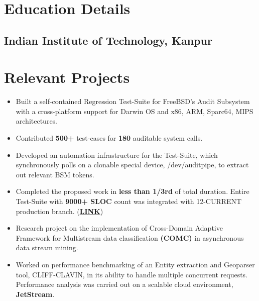 \documentclass[10pt, margin=0.5in]{deedy-resume-openfont}
\begin{document}
\begin{minipage}[t]{0.47\textwidth}


\vspace{-8pt}
\section{Education Details}
\subsection{Indian Institute of Technology, Kanpur}

\section{Relevant Projects}
\begin{itemize}[leftmargin=*, noitemsep]
\item Built a self-contained Regression Test-Suite for FreeBSD's Audit Subsystem with a cross-platform support for Darwin OS and x86, ARM, Sparc64, MIPS architectures.
  \item Contributed \textbf{500+} test-cases for \textbf{180} auditable system calls.
  \item Developed an automation infrastructure for the Test-Suite, which synchronously polls on a clonable special device, /dev/auditpipe, to extract out relevant BSM tokens.
  \item	Completed the proposed work in \textbf{less than 1/3rd} of total duration. Entire Test-Suite with \textbf{9000+ SLOC} count was integrated with 12-CURRENT production branch. (\href{https://github.com/freebsd/freebsd/tree/master/tests/sys/audit}{\textbf{LINK}})
\end{itemize}

\vspace{5pt}

\begin{itemize}[leftmargin=*, noitemsep]
  \item Research project on the implementation of Cross-Domain Adaptive Framework for Multistream data classification \textbf{(COMC)} in asynchronous data stream mining.
  \item Worked on performance benchmarking of an Entity extraction and Geoparser tool, CLIFF-CLAVIN, in its ability to handle multiple concurrent requests. Performance analysis was carried out on a scalable cloud environment, \textbf{JetStream}.
\end{itemize}


\end{minipage}
\end{document}
